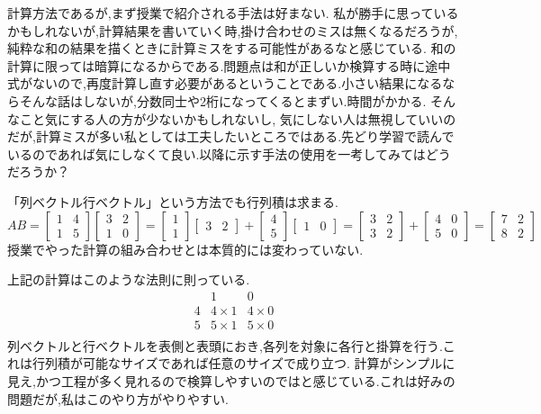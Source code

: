 計算方法であるが,まず授業で紹介される手法は好まない.
私が勝手に思っているかもしれないが,計算結果を書いていく時,掛け合わせのミスは無くなるだろうが,純粋な和の結果を描くときに計算ミスをする可能性があるなと感じている.
和の計算に限っては暗算になるからである.問題点は和が正しいか検算する時に途中式がないので,再度計算し直す必要があるということである.小さい結果になるならそんな話はしないが,分数同士や2桁になってくるとまずい.時間がかかる.
そんなこと気にする人の方が少ないかもしれないし,
気にしない人は無視していいのだが,計算ミスが多い私としては工夫したいところではある.先どり学習で読んでいるのであれば気にしなくて良い.以降に示す手法の使用を一考してみてはどうだろうか？\medskip\\
\begin{framed}
「列ベクトル\times 行ベクトル」という方法でも行列積は求まる.\\
\begin{equation}AB=
\begin{bmatrix}
    1 & 4 \\ 1 & 5 
\end{bmatrix}
\begin{bmatrix}
    3 & 2 \\ 1 & 0
\end{bmatrix}
=
\begin{bmatrix}
    1 \\ 1
\end{bmatrix}
\begin{bmatrix}
    3 & 2
\end{bmatrix}
+
\begin{bmatrix}
    4 \\ 5
\end{bmatrix}
\begin{bmatrix}
    1 & 0
\end{bmatrix}
=
\begin{bmatrix}
    3 & 2 \\ 3 & 2
\end{bmatrix}
+
\begin{bmatrix}
    4 & 0 \\ 5 & 0
\end{bmatrix}
=
\begin{bmatrix}
    7 & 2 \\ 8 & 2
\end{bmatrix}\label{eq:ex_col_times_row}
\end{equation}
授業でやった計算の組み合わせとは本質的には変わっていない.
\end{framed}
上記の計算はこのような法則に則っている.
\[
\begin{array}{c|cc}
     & 1 & 0 \\ \hline
  4  & 4\times1 & 4\times0 \\
  5  & 5\times1 & 5\times0 \\
\end{array}
\]
列ベクトルと行ベクトルを表側と表頭におき,各列を対象に各行と掛算を行う.これは行列積が可能なサイズであれば任意のサイズで成り立つ.
計算がシンプルに見え,かつ工程が多く見れるので検算しやすいのではと感じている.これは好みの問題だが,私はこのやり方がやりやすい.

